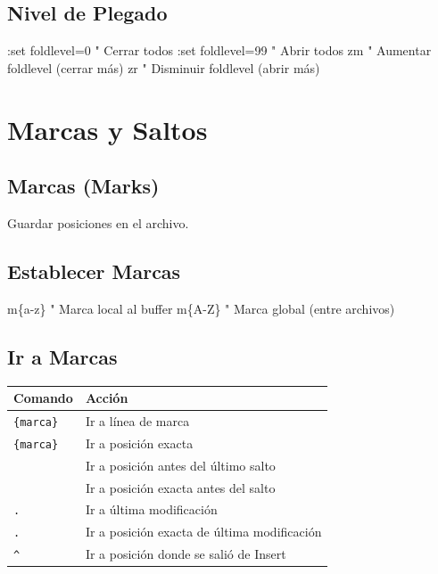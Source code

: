 \documentclass[
  doc,
  floatsintext,
  longtable,
  a4paper,
  nolmodern,
  notxfonts,
  notimes,
  12pt,
  colorlinks=true,linkcolor=blue,citecolor=blue,urlcolor=blue]{apa7}
\newenvironment{Shaded}{\begin{snugshade}}{\end{snugshade}}
\newcommand{\NormalTok}[1]{\textcolor[rgb]{0.00,0.23,0.31}{#1}}
\newcounter{none} %
\begin{document}
\subsection{Nivel de Plegado}\label{nivel-de-plegado}

\begin{Shaded}
\begin{Highlighting}[]
\NormalTok{:set foldlevel=0     " Cerrar todos}
\NormalTok{:set foldlevel=99    " Abrir todos}
\NormalTok{zm                   " Aumentar foldlevel (cerrar más)}
\NormalTok{zr                   " Disminuir foldlevel (abrir más)}
\end{Highlighting}
\end{Shaded}

\section{Marcas y Saltos}\label{marcas-y-saltos}

\subsection{Marcas (Marks)}\label{marcas-marks}

Guardar posiciones en el archivo.

\subsection{Establecer Marcas}\label{establecer-marcas}

\begin{Shaded}
\begin{Highlighting}[]
\NormalTok{m\{a{-}z\}      " Marca local al buffer}
\NormalTok{m\{A{-}Z\}      " Marca global (entre archivos)}
\end{Highlighting}
\end{Shaded}

\subsection{Ir a Marcas}\label{ir-a-marcas}

{\def\LTcaptype{none} %
\begin{longtable}[]{@{}ll@{}}
\toprule\noalign{}
Comando & Acción \\
\midrule\noalign{}
\endhead
\bottomrule\noalign{}
\endlastfoot
\texttt{\textquotesingle{}\{marca\}} & Ir a línea de marca \\
\texttt{\textasciigrave{}\{marca\}} & Ir a posición exacta \\
\texttt{\textquotesingle{}\textquotesingle{}} & Ir a posición antes del
último salto \\
\texttt{\textasciigrave{}\textasciigrave{}} & Ir a posición exacta antes
del salto \\
\texttt{\textquotesingle{}.} & Ir a última modificación \\
\texttt{\textasciigrave{}.} & Ir a posición exacta de última
modificación \\
\texttt{\textquotesingle{}\^{}} & Ir a posición donde se salió de
Insert \\
\end{longtable}
}
\end{document}
